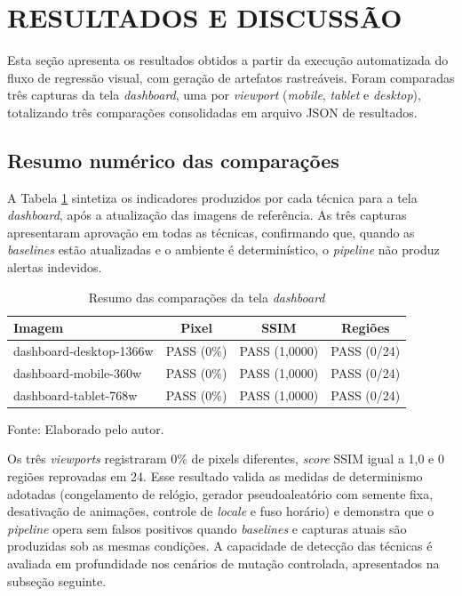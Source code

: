\documentclass{UNESC}
\begin{document}
\section{RESULTADOS E DISCUSSÃO}

Esta seção apresenta os resultados obtidos a partir da execução automatizada do fluxo de regressão visual, com geração de artefatos rastreáveis. Foram comparadas três capturas da tela \textit{dashboard}, uma por \emph{viewport} (\textit{mobile}, \textit{tablet} e \textit{desktop}), totalizando três comparações consolidadas em arquivo JSON de resultados.

\subsection{Resumo numérico das comparações}
A Tabela \ref{tab:resumo-resultados} sintetiza os indicadores produzidos por cada técnica para a tela \textit{dashboard}, após a atualização das imagens de referência. As três capturas apresentaram aprovação em todas as técnicas, confirmando que, quando as \emph{baselines} estão atualizadas e o ambiente é determinístico, o \emph{pipeline} não produz alertas indevidos.

\begin{table}[H]
\centering
\caption{Resumo das comparações da tela \textit{dashboard}}
\label{tab:resumo-resultados}
\small
\setlength{\tabcolsep}{6pt}
\renewcommand{\arraystretch}{1.2}
\begin{tabular}{|l|c|c|c|}
\hline
\textbf{Imagem} & \textbf{Pixel} & \textbf{SSIM} & \textbf{Regiões} \\
\hline
dashboard-desktop-1366w & PASS (0\%) & PASS (1,0000) & PASS (0/24) \\
dashboard-mobile-360w & PASS (0\%) & PASS (1,0000) & PASS (0/24) \\
dashboard-tablet-768w & PASS (0\%) & PASS (1,0000) & PASS (0/24) \\
\hline
\end{tabular}
\vspace{-0.2cm}
\hspace{1cm}\footnotesize Fonte: Elaborado pelo autor.
\end{table}

Os três \emph{viewports} registraram 0\% de pixels diferentes, \emph{score} SSIM igual a 1,0 e 0 regiões reprovadas em 24. Esse resultado valida as medidas de determinismo adotadas (congelamento de relógio, gerador pseudoaleatório com semente fixa, desativação de animações, controle de \emph{locale} e fuso horário) e demonstra que o \emph{pipeline} opera sem falsos positivos quando \emph{baselines} e capturas atuais são produzidas sob as mesmas condições. A capacidade de detecção das técnicas é avaliada em profundidade nos cenários de mutação controlada, apresentados na subseção seguinte.
\end{document}
